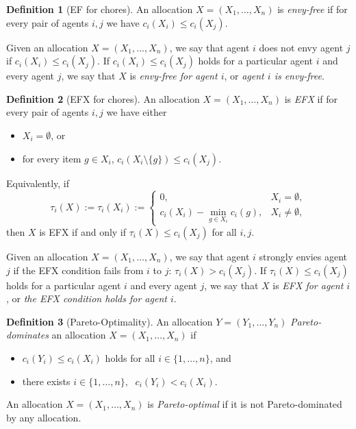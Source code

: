 \documentclass{article}
\theoremstyle{definition}
\newtheorem{definition}{Definition}
\begin{document}
\begin{definition}[EF for chores]
An allocation $X=(X_1,\ldots,X_n)$ is \emph{envy-free} if for every pair of agents $i,j$ we have $c_i(X_i)\leq c_i(X_j)$.
\end{definition}

Given an allocation $X=(X_1,\ldots,X_n)$, we say that agent $i$ does not envy agent $j$ if $c_i(X_i)\leq c_i(X_j)$.
If $c_i(X_i)\leq c_i(X_j)$ holds for a particular agent $i$ and every agent $j$, we say that $X$ is \emph{envy-free for agent $i$}, or \emph{agent $i$ is envy-free}.

\begin{definition}[EFX for chores]
An allocation $X=(X_1,\ldots,X_n)$ is \emph{EFX} if for every pair of agents $i,j$ we have either
\begin{itemize}
    \item $X_i=\emptyset$, or
    \item for every item $g\in X_i$, $c_i(X_i\setminus\{g\})\le c_i(X_j).$
\end{itemize}
Equivalently, if
\[
    \tau_i(X):=\tau_i(X_i):=
    \begin{cases}
        0, & X_i=\emptyset,\\
        c_i(X_i)-\min_{g\in X_i}c_i(g), & X_i\ne\emptyset,
    \end{cases}
\]
then $X$ is EFX if and only if $\tau_i(X)\le c_i(X_j)$ for all $i,j$.
\end{definition}

Given an allocation $X=(X_1,\ldots,X_n)$, we say that agent $i$ strongly envies agent $j$ if the EFX condition fails from $i$ to $j$: $\tau_i(X)>c_i(X_j)$.
If $\tau_i(X)\leq c_i(X_j)$ holds for a particular agent $i$ and every agent $j$, we say that $X$ is \emph{EFX for agent $i$}, or \emph{the EFX condition holds for agent $i$}.

\begin{definition}[Pareto-Optimality]
    An allocation $Y=(Y_1,\ldots,Y_n)$ \emph{Pareto-dominates} an allocation $X=(X_1,\ldots,X_n)$ if
    \begin{itemize}
        \item $c_i(Y_i)\leq c_i(X_i)$ holds for all $i\in\{1,\ldots,n\}$, and
        \item there exists $i\in\{1,\ldots,n\},\;$ $c_i(Y_i)<c_i(X_i)$.
    \end{itemize}
    An allocation $X=(X_1,\ldots,X_n)$ is \emph{Pareto-optimal} if it is not Pareto-dominated by any allocation.
\end{definition}
\end{document}

